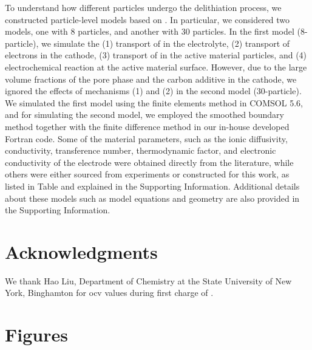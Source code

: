 \documentclass{article}
\begin{document}

To understand how different particles undergo the delithiation
process, we constructed particle-level models based on \citeme{}. In
particular, we considered two models, one with 8 particles, and
another with 30 particles. In the first model (8-particle), we
simulate the (1) transport of  in the electrolyte, (2)
transport of electrons in the cathode, (3) transport of  in
the active material particles, and (4) electrochemical reaction at the
active material surface. However, due to the large volume fractions of
the pore phase and the carbon additive in the cathode, we ignored the
effects of mechanisms (1) and (2) in the second model
(30-particle). We simulated the first model using the finite elements
method in COMSOL 5.6, and for simulating the second model, we employed
the smoothed boundary method 
together with the finite difference method in our in-house developed
Fortran code. Some of the material parameters, such as the ionic
diffusivity, conductivity, transference number, thermodynamic factor,
and electronic conductivity of the \nca{} electrode were obtained
directly from the literature, while others were either sourced from experiments or
constructed for this work, as listed in Table
 and explained in the Supporting
Information. Additional details about these models such as model
equations and geometry are also provided in the Supporting
Information.


\section*{Acknowledgments}

We thank Hao Liu, Department of Chemistry at the State University of
New York, Binghamton for \gls{ocv} values during first charge of
\nca{}.



\newpage
\section*{Figures}
\end{document}
